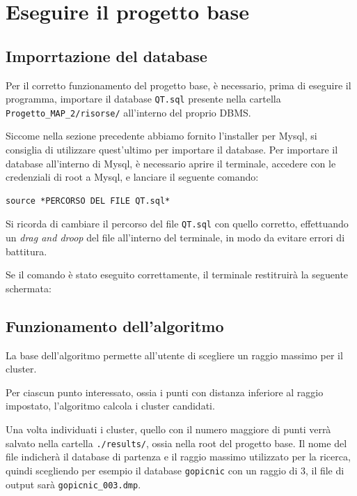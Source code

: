 


\section{Eseguire il progetto base}
\subsection{Imporrtazione del database}
Per il corretto funzionamento del progetto base, è necessario, prima di eseguire il programma, importare il database \texttt{QT.sql} presente nella cartella \texttt{Progetto_MAP_2/risorse/} all'interno del proprio DBMS.

Siccome nella sezione precedente abbiamo fornito l'installer per Mysql, si consiglia di utilizzare quest'ultimo per importare il database. Per importare il database all'interno di Mysql, è necessario aprire il terminale, accedere con le credenziali di root a Mysql, e lanciare il seguente comando:

\begin{verbatim}
source *PERCORSO DEL FILE QT.sql*
\end{verbatim}

\begin{tcolorbox}[  colback=white!5!white, colframe=gray, title={Avvertenza} ]

    Si ricorda di cambiare il percorso del file \texttt{QT.sql} con quello corretto, effettuando un \textit{drag and droop} del file all'interno del terminale, in modo da evitare errori di battitura. 
    
\end{tcolorbox}

Se il comando è stato eseguito correttamente, il terminale restitruirà la seguente schermata:


\subsection{Funzionamento dell'algoritmo}

La base dell'algoritmo permette all'utente di scegliere un raggio massimo per il cluster. 

Per ciascun punto interessato, ossia i punti con distanza inferiore al raggio impostato, l'algoritmo calcola i cluster candidati.

Una volta individuati i cluster, quello con il numero maggiore di punti verrà salvato nella cartella \texttt{./results/}, ossia nella root del progetto base. Il nome del file indicherà il database di partenza e il raggio massimo utilizzato per la ricerca, quindi scegliendo per esempio il database \texttt{gopicnic} con un raggio di 3, il file di output sarà \texttt{gopicnic\_003.dmp}.

